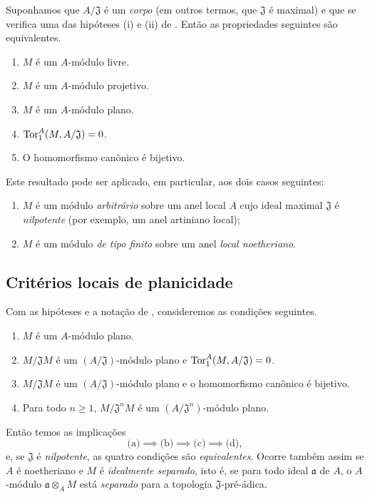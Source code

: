 \begin{env}[10.1.3]
\label{0.10.1.3}
Suponhamos que $A/\mathfrak{J}$ é um \emph{corpo} (em outros termos, que $\mathfrak{J}$ é maximal) e que se verifica uma das hipóteses (i) e (ii) de .
Então as propriedades seguintes são equivalentes.
\begin{enumerate}
  \item[(a)] $M$ é um $A$-módulo livre.
  \item[(b)] $M$ é um $A$-módulo projetivo.
  \item[(c)] $M$ é um $A$-módulo plano.
  \item[(d)] $\operatorname{Tor}_1^A(M,A/\mathfrak{J})=0$.
  \item[(e)] O homomorfismo canônico  é bijetivo.
\end{enumerate}

Este resultado pode ser aplicado, em particular, aos dois casos seguintes:
\begin{enumerate}
  \item[(i)] $M$ é um módulo \emph{arbitrário} sobre um anel local $A$ cujo ideal maximal $\mathfrak{J}$ é \emph{nilpotente} (por exemplo, um anel artiniano local);
  \item[(ii)] $M$ é um módulo \emph{de tipo finito} sobre um anel \emph{local noetheriano}.
\end{enumerate}
\end{env}

\subsection{Critérios locais de planicidade}
\label{subsection:0.10.2}

\begin{env}[10.2.1]
\label{0.10.2.1}
Com as hipóteses e a notação de , consideremos as condições seguintes.
\begin{enumerate}
  \item[(a)] $M$ é um $A$-módulo plano.
  \item[(b)] $M/\mathfrak{J}M$ é um $(A/\mathfrak{J})$-módulo plano e $\operatorname{Tor}_1^A(M,A/\mathfrak{J})=0$.
  \item[(c)] $M/\mathfrak{J}M$ é um $(A/\mathfrak{J})$-módulo plano e o homomorfismo canônico  é bijetivo.
  \item[(d)] Para todo $n\geq1$, $M/\mathfrak{J}^nM$ é um $(A/\mathfrak{J}^n)$-módulo plano.
\end{enumerate}

Então temos as implicações
\[
  \text{(a)}\implies\text{(b)}\implies\text{(c)}\implies\text{(d)},
\]
e, se $\mathfrak{J}$ é \emph{nilpotente}, as quatro condições são \emph{equivalentes}.
Ocorre também assim se $A$ é noetheriano e $M$ é \emph{idealmente separado}, isto é, se para todo ideal $\mathfrak{a}$ de $A$, o $A$-módulo $\mathfrak{a}\otimes_A M$ está \emph{separado} para a topologia $\mathfrak{J}$-pré-ádica.
\end{env}

